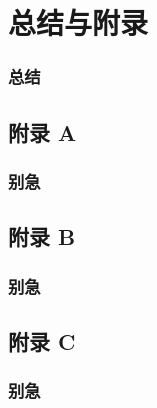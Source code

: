 
\section*{总结与附录}
\begin{frame}
  \frametitle{总结}
\end{frame}
\begin{frame}[c]
  \thankspage
\end{frame}
\subsection*{附录 A}
\begin{frame} %
  \frametitle{别急}
\end{frame}
\subsection*{附录 B}
\begin{frame} %
  \frametitle{别急}
\end{frame}
\subsection*{附录 C}
\begin{frame} %
  \frametitle{别急}
\end{frame}
